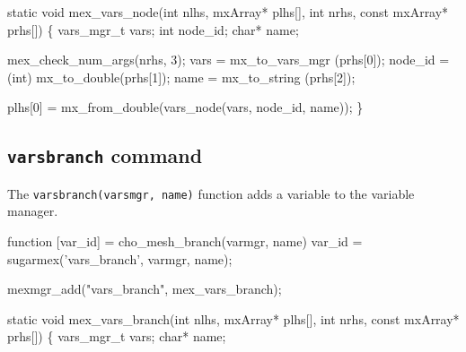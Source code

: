 \nwenddocs{}\endmoddef
static void mex_vars_node(int nlhs, mxArray* plhs[],
                          int nrhs, const mxArray* prhs[])
\{
    vars_mgr_t vars;
    int        node_id;
    char*      name;

    mex_check_num_args(nrhs, 3);
    vars    = mx_to_vars_mgr    (prhs[0]);
    node_id = (int) mx_to_double(prhs[1]);
    name    = mx_to_string      (prhs[2]);

    plhs[0] = mx_from_double(vars_node(vars, node_id, name));
\}

\nwendcode{}\nwdocspar


\subsection{{\tt{}vars{}branch} command}

The {\tt{}vars{}branch(vars{}mgr,\ name)} function adds a variable
to the variable manager.

\nwenddocs{}\endmoddef
function [var_id] = cho_mesh_branch(varmgr, name)
var_id = sugarmex('vars_branch', varmgr, name);
\nwendcode{}\nwdocspar

\nwenddocs{}\plusendmoddef
mexmgr_add("vars_branch", mex_vars_branch);
\nwendcode{}\nwdocspar

\nwenddocs{}\plusendmoddef
static void mex_vars_branch(int nlhs, mxArray* plhs[],
                            int nrhs, const mxArray* prhs[])
\{
    vars_mgr_t vars;
    char*      name;

